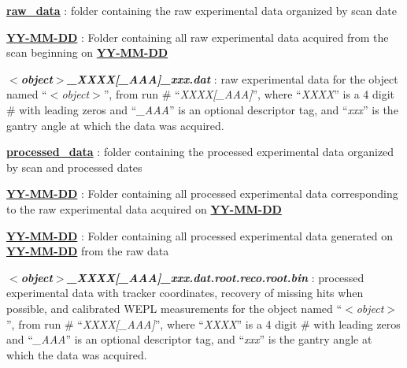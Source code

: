\documentclass[landscape]{article}
\begin{document}
\begin{myEnumerate}[labelindent=1pt, leftmargin=*]
    \item \ul{\textbf{raw\_data}} : folder containing the raw experimental data organized by scan date
    \begin{myEnumerate}[labelindent=1pt, leftmargin=*]
        \item \ul{\textbf{YY-MM-DD}} : Folder containing all raw experimental data acquired from the scan beginning on \ul{\textbf{YY-MM-DD}}
        \begin{myEnumerate}[labelindent=1pt, leftmargin=*]
            \item \textbf{\textit{$<$object$>$\_XXXX[\_AAA]\_xxx.dat}} : raw experimental data for the object named ``\textit{$<$object$>$}'', from run \# ``\textit{XXXX[\_AAA]}'', where ``\textit{XXXX}'' is a 4 digit \# with leading zeros and ``\textit{\_AAA}'' is an optional descriptor tag, and ``\textit{xxx}'' is the gantry angle at which the data was acquired.
        \end{myEnumerate}
    \end{myEnumerate}
    \item \ul{\textbf{processed\_data}} : folder containing the processed experimental data organized by scan and processed dates
    \begin{myEnumerate}[labelindent=1pt, leftmargin=*]
        \item \ul{\textbf{YY-MM-DD}} : Folder containing all processed experimental data corresponding to the raw experimental data acquired on \ul{\textbf{YY-MM-DD}}
        \begin{myEnumerate}[labelindent=1pt, leftmargin=*]
            \item \ul{\textbf{YY-MM-DD}} : Folder containing all processed experimental data generated on \ul{\textbf{YY-MM-DD}} from the raw data
            \begin{myEnumerate}[labelindent=1pt, leftmargin=*]
                \item \textbf{\textit{$<$object$>$\_XXXX[\_AAA]\_xxx.dat.root.reco.root.bin}} : processed experimental data with tracker coordinates, recovery of missing hits when possible, and calibrated WEPL measurements for the object named ``\textit{$<$object$>$}'', from run \# ``\textit{XXXX[\_AAA]}'', where ``\textit{XXXX}'' is a 4 digit \# with leading zeros and ``\textit{\_AAA}'' is an optional descriptor tag, and ``\textit{xxx}'' is the gantry angle at which the data was acquired.
            \end{myEnumerate}
        \end{myEnumerate}
    \end{myEnumerate}
\end{myEnumerate}

\end{document}
